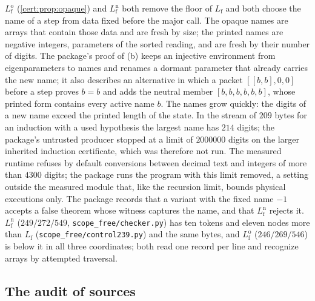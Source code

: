 \begin{remark}\label{cert:rem:printed}
$L^{\mathrm o}_{\mathrm f}$ (\cref{cert:prop:opaque}) and $L^{\mathrm n}_{\mathrm f}$ both remove the
floor of $L_{\mathrm f}$ and both choose the name of a step from data fixed before the major call.
The opaque names are arrays that contain those data and are fresh by size; the printed names are
negative integers, parameters of the sorted reading, and are fresh by their number of digits. The
package's proof of (b) keeps an injective environment from eigenparameters to names and renames a
dormant parameter that already carries the new name; it also describes an alternative in which a
packet $[[b,b],0,0]$ before a step proves $b=b$ and adds the neutral member $[b,b,b,b,b,b]$, whose
printed form contains every active name $b$. The names grow quickly: the digits of a new name exceed
the printed length of the state. In the stream of $209$ bytes for an induction with a used
hypothesis the largest name has $214$ digits; the package's untrusted producer stopped at a limit of
$2000000$ digits on the larger inherited induction certificate, which was therefore not run. The
measured runtime refuses by default conversions between decimal text and integers of more than
$4300$ digits; the package runs the program with this limit removed, a setting outside the measured
module that, like the recursion limit, bounds physical executions only. The package records that a
variant with the fixed name $-1$ accepts a false theorem whose witness captures the name, and that
$L^{\mathrm n}_{\mathrm f}$ rejects it. $L^{\mathrm n}_{\mathrm f}$ ($249/272/549$,
\texttt{scope\_free/checker.py}) has ten tokens and eleven nodes more than $L_{\mathrm f}$
(\texttt{scope\_free/control239.py}) and the same bytes, and $L^{\mathrm o}_{\mathrm f}$
($246/269/546$) is below it in all three coordinates; both read one record per line and recognize
arrays by attempted traversal.
\end{remark}

\subsection{The audit of sources}

